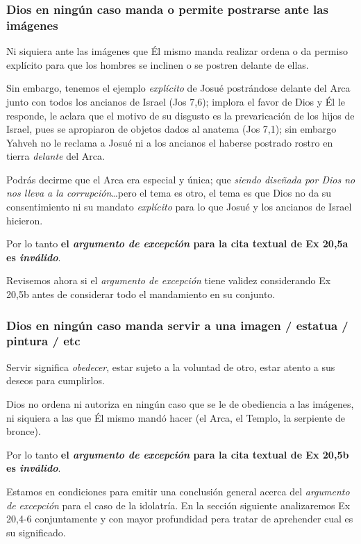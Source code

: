 \documentclass{article}
\begin{document}
\subsubsection{Dios en ning\'un caso manda o permite postrarse ante las im\'agenes}

Ni siquiera ante las im\'agenes que \'El mismo manda realizar ordena o da permiso expl\'{i}cito para que los hombres se inclinen o se postren delante de ellas.

Sin embargo, tenemos el ejemplo \emph{expl\'{i}cito} de Josu\'e postr\'andose delante del Arca junto con todos los ancianos de Israel (Jos 7,6); implora el favor de Dios y \'El le responde, le aclara que el motivo de su disgusto es la prevaricaci\'on de los hijos de Israel, pues se apropiaron de objetos dados al anatema (Jos 7,1); sin embargo Yahveh no le reclama a Josu\'e ni a los ancianos el haberse postrado rostro en tierra \emph{delante} del Arca.

Podr\'as decirme que el Arca era especial y \'unica; que \emph{siendo dise\~nada por Dios no nos lleva a la corrupci\'on}\ldots pero el tema es otro, el tema es que Dios no da su consentimiento ni su mandato \emph{expl\'{i}cito} para lo que Josu\'e y los ancianos de Israel hicieron.

Por lo tanto \textbf{el \emph{argumento de excepci\'on} para la cita textual de Ex 20,5a es \emph{inv\'alido}}.

Revisemos ahora si el \emph{argumento de excepci\'on} tiene validez considerando Ex 20,5b antes de considerar todo el mandamiento en su conjunto.

\subsubsection{Dios en ning\'un caso manda servir a una imagen / estatua / pintura / etc}

Servir significa \emph{obedecer}, estar sujeto a la voluntad de otro, estar atento a sus deseos para cumplirlos.

Dios no ordena ni autoriza en ning\'un caso que se le de obediencia a las im\'agenes, ni siquiera a las que \'El mismo mand\'o hacer (el Arca, el Templo, la serpiente de bronce).

Por lo tanto \textbf{el \emph{argumento de excepci\'on} para la cita textual de Ex 20,5b es \emph{inv\'alido}}.

Estamos en condiciones para emitir una conclusi\'on general acerca del \emph{argumento de excepci\'on} para el caso de la idolatr\'{i}a. En la secci\'on siguiente analizaremos Ex 20,4-6 conjuntamente y con mayor profundidad pera tratar de aprehender cual es su significado.
\end{document}
